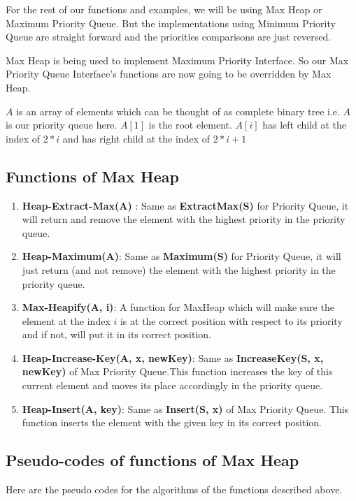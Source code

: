 For the rest of our functions and examples, we will be using Max Heap or Maximum Priority Queue. But the implementations using Minimum Priority Queue are straight forward and the priorities comparisons are just reversed.

Max Heap is being used to implement Maximum Priority Interface.
So our  Max Priority Queue Interface's  functions are now going to be overridden by Max Heap.

$A$ is an array of elements which can be thought of as complete binary tree i.e. $A$ is our priority queue here. $A[1]$ is the root element.
$A[i]$ has left child at the index of $2*i$ and has right child at the index of
$2*i + 1$

\subsection{Functions of Max Heap}
\begin{enumerate}
    \item \textbf{Heap-Extract-Max(A)} : Same as \textbf{ExtractMax(S)} for Priority Queue, it will return and remove the element with the highest priority in the priority queue.
    \item \textbf{Heap-Maximum(A)}: Same as \textbf{Maximum(S)} for Priority Queue, it will just return (and not remove) the element with the highest priority in the priority queue.
    \item \textbf{Max-Heapify(A, i)}: A function for MaxHeap which will make sure the element at the index $i$ is at the correct position with respect to its priority and if not, will put it in its correct position.
    \item \textbf{Heap-Increase-Key(A, x, newKey)}: Same as \textbf{IncreaseKey(S, x, newKey)} of Max Priority Queue.This function increases the key of this current element and moves its place accordingly in the priority queue.
    \item \textbf{Heap-Insert(A, key)}: Same as \textbf{Insert(S, x)} of Max Priority Queue. This function inserts the element with the given key in its correct position.
\end{enumerate}


\newpage
\subsection{Pseudo-codes of functions of Max Heap}
Here are the pseudo codes for the algorithms of the functions described above.

